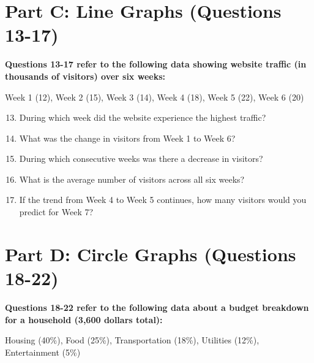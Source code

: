 \documentclass[12pt]{article}
\begin{document}
\section*{Part C: Line Graphs (Questions 13-17)}

\noindent\textbf{Questions 13-17 refer to the following data showing website traffic (in thousands of visitors) over six weeks:}

\noindent Week 1 (12), Week 2 (15), Week 3 (14), Week 4 (18), Week 5 (22), Week 6 (20)

\begin{enumerate}
\setcounter{enumi}{12}
\item During which week did the website experience the highest traffic?
\vspace{0.8in}

\item What was the change in visitors from Week 1 to Week 6?
\vspace{0.8in}

\item During which consecutive weeks was there a decrease in visitors?
\vspace{0.8in}

\item What is the average number of visitors across all six weeks?
\vspace{0.8in}

\item If the trend from Week 4 to Week 5 continues, how many visitors would you predict for Week 7?
\vspace{0.8in}
\end{enumerate}

\section*{Part D: Circle Graphs (Questions 18-22)}

\noindent\textbf{Questions 18-22 refer to the following data about a budget breakdown for a household (3,600 dollars total):}

\noindent Housing (40\%), Food (25\%), Transportation (18\%), Utilities (12\%), Entertainment (5\%)
\end{document}

